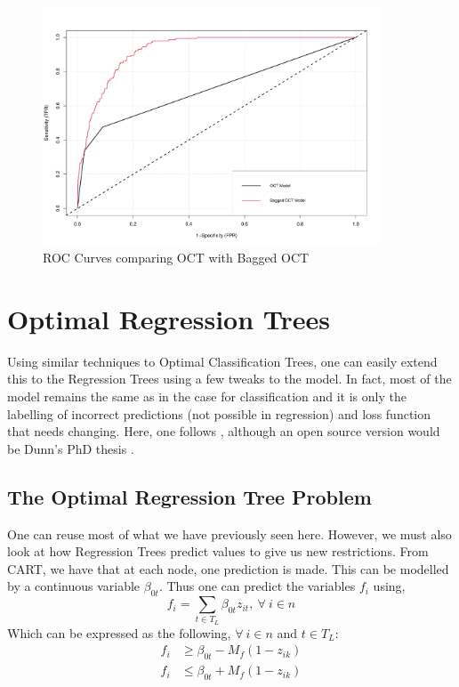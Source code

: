 \documentclass[11pt,a4paper]{report}
\begin{document}
\begin{figure}
    \centering
    \includegraphics[width = 10cm]{reportcharts/octvbagged.pdf}
    \caption{ROC Curves comparing OCT with Bagged OCT}
    \label{fig:octroc}
\end{figure}

\section{Optimal Regression Trees}
Using similar techniques to Optimal Classification Trees, one can easily extend this to the Regression Trees using a few tweaks to the model.
In fact, most of the model remains the same as in the case for classification and it is only the labelling of incorrect predictions (not possible in regression) and loss function that needs changing.
Here, one follows \cite{octbook}, although an open source version would be Dunn's PhD thesis \cite{jackdunn}.

\subsection{The Optimal Regression Tree Problem}
One can reuse most of what we have previously seen here.
However, we must also look at how Regression Trees predict values to give us new restrictions.
From CART, we have that at each node, one prediction is made.
This can be modelled by a continuous variable $\beta_{0t}$.
Thus one can predict the variables $f_i$ using,
\[
f_i = \sum_{t \in T_L} \beta_{0t} z_{it}, \ \forall \ i \in n
\]
Which can be expressed as the following, $\forall \ i \in n$ and $t \in T_L$:
\begin{align}
    f_i &\geq \beta_{0t} - M_f (1 - z_{ik}) \label{eq:ortlin1} \\ 
    f_i &\leq \beta_{0t} + M_f (1 - z_{ik}) \label{eq:ortlin2}
\end{align}
\end{document}
